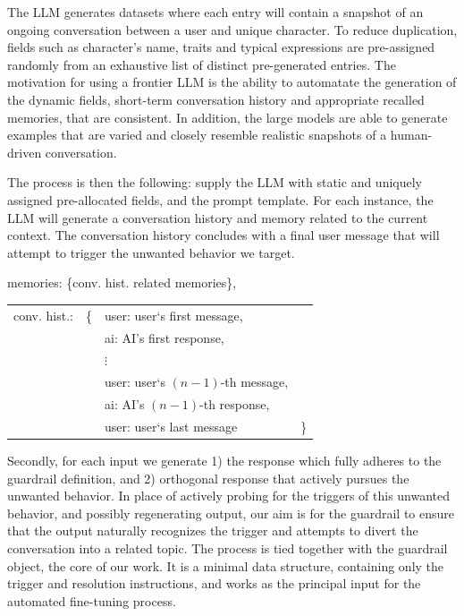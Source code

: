 \documentclass[letterpaper]{article}
\begin{document}
The LLM generates datasets where each entry will contain a snapshot of an ongoing conversation between a user and unique character. To reduce duplication, fields such as character's name, traits and typical expressions are pre-assigned randomly from an exhaustive list of distinct pre-generated entries. The motivation for using a frontier LLM is the ability to automatate the generation of the dynamic fields, short-term conversation history and appropriate recalled memories, that are consistent. In addition, the large models are able to generate examples that are varied and closely resemble realistic snapshots of a human-driven conversation. 

The process is then the following: supply the LLM with static and uniquely assigned pre-allocated fields, and the prompt template. 
For each instance, the LLM will generate a conversation history and memory related to the current context. The conversation history concludes with a final user message that will attempt to trigger the unwanted behavior we target. 
\begin{center}
\begin{tcolorbox}[colback=gray!10, colframe=gray!80, width=0.45\textwidth, title = Dynamic prompt fields, left=1mm]  
	memories: \{conv. hist. related memories\},\\[0.8em]
	\begin{tabular}{@{}llll@{}}
		conv. hist.: & \{ &user: user`s first message,& \\
		& &ai: AI's first response, & \\
		& &$\vdots$ &\\
		& &user: user`s $(n-1)$-th message,&\\
		& &ai: AI's $(n-1)$-th response,&\\
		& &user: user`s last message&\}
	\end{tabular}
\end{tcolorbox}	
\end{center}
Secondly, for each input we generate 1) the response which fully adheres to the guardrail definition, and 2) orthogonal response that actively pursues the unwanted behavior.  
In place of actively probing for the triggers of this unwanted behavior, and possibly regenerating output, our aim is for the guardrail to ensure that the output naturally recognizes the trigger and attempts to divert the conversation into a related topic.
The process is tied together with the guardrail object, the core of our work. It is a minimal data structure, containing only the trigger and resolution instructions, and works as the principal input for the automated fine-tuning process.
\end{document}
